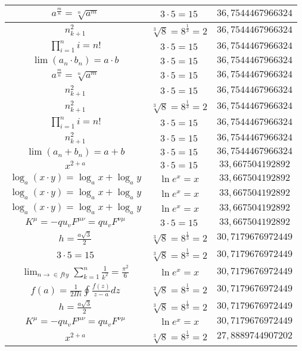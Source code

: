 \documentclass{article}
\begin{document}
\begin{flushleft}
\begin{longtable}{|c|c|c|}
$a^{\frac{m}{n}}=\sqrt[n]{a^{m}}$ & $3\cdot 5=15$ & $36,7544467966324$ \\ \hline 
$n_{k+1}^2$ & $\sqrt[3]{8}=8^{\frac{1}{3}}=2$ & $36,7544467966324$ \\ \hline 
$\prod_{i=1}^ni=n!$ & $3\cdot 5=15$ & $36,7544467966324$ \\ \hline 
$\lim\left(a_n\cdot b_n\right)=a\cdot b$ & $3\cdot 5=15$ & $36,7544467966324$ \\ \hline 
$a^{\frac{m}{n}}=\sqrt[n]{a^{m}}$ & $3\cdot 5=15$ & $36,7544467966324$ \\ \hline 
$n_{k+1}^2$ & $3\cdot 5=15$ & $36,7544467966324$ \\ \hline 
$n_{k+1}^2$ & $\sqrt[3]{8}=8^{\frac{1}{3}}=2$ & $36,7544467966324$ \\ \hline 
$\prod_{i=1}^ni=n!$ & $3\cdot 5=15$ & $36,7544467966324$ \\ \hline 
$n_{k+1}^2$ & $3\cdot 5=15$ & $36,7544467966324$ \\ \hline 
$\lim\left(a_n+b_n\right)=a+b$ & $3\cdot 5=15$ & $36,7544467966324$ \\ \hline 
$x^{2+a}$ & $3\cdot 5=15$ & $33,667504192892$ \\ \hline 
$\log_{a}(x\cdot y)=\log_{a}x+\log_{a}y$ & $\ln e^x=x$ & $33,667504192892$ \\ \hline 
$\log_{a}(x\cdot y)=\log_{a}x+\log_{a}y$ & $\ln e^x=x$ & $33,667504192892$ \\ \hline 
$\log_{a}(x\cdot y)=\log_{a}x+\log_{a}y$ & $\ln e^x=x$ & $33,667504192892$ \\ \hline 
$K^\mu=-qu_vF^{\mu\nu}=qu_vF^{\nu\mu}$ & $3\cdot 5=15$ & $33,667504192892$ \\ \hline 
$h=\frac{a\sqrt{3}}{2}$ & $\sqrt[3]{8}=8^{\frac{1}{3}}=2$ & $30,7179676972449$ \\ \hline 
$3\cdot 5=15$ & $\sqrt[3]{8}=8^{\frac{1}{3}}=2$ & $30,7179676972449$ \\ \hline 
$\lim_{n\to\in fty}\sum_{k=1}^n\frac{1}{k^2}=\frac{\pi^2}{6}$ & $\ln e^x=x$ & $30,7179676972449$ \\ \hline 
$f\left(a\right)=\frac{1}{2\Pi i}\oint\frac{f\left(z\right)}{z-a}dz$ & $\sqrt[3]{8}=8^{\frac{1}{3}}=2$ & $30,7179676972449$ \\ \hline 
$h=\frac{a\sqrt{3}}{2}$ & $\sqrt[3]{8}=8^{\frac{1}{3}}=2$ & $30,7179676972449$ \\ \hline 
$K^\mu=-qu_vF^{\mu\nu}=qu_vF^{\nu\mu}$ & $\ln e^x=x$ & $30,7179676972449$ \\ \hline 
$x^{2+a}$ & $\sqrt[3]{8}=8^{\frac{1}{3}}=2$ & $27,8889744907202$ \\ \hline 

\end{longtable}
\end{flushleft}
\end{document}
